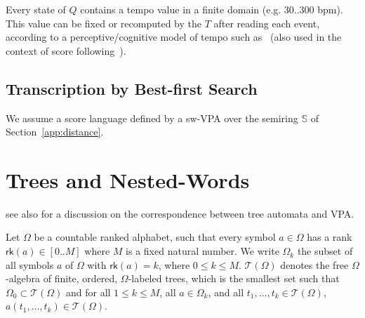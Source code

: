 \documentclass[runningheads]{llncs}
\newcommand{\T}{\mathcal{T}}
\newcommand{\Semiring}{\mathbb{S}}
\def\SWVPA{\textsf{sw-VPA}\xspace}
\def\Omegai{{\Omega_\mathsf{i}}}
\newcommand{\rank}{\mathsf{rk}}
\begin{document}
Every state of $Q$ contains a 
tempo value in a finite domain (e.g. 30..300 bpm).
This value can be fixed 
or recomputed by the $T$ %
after reading each event, 
according to a perceptive/cognitive model of tempo 
such as~\cite{LargeJones99tempo}
(also used in the context of score following~\cite{Cont10TPAMI}).


\subsection{Transcription by Best-first Search}
We assume a score language defined by a \SWVPA over the semiring 
$\Semiring$ of Section~\ref{app:distance}.






%
% 

%






\newpage
\appendix 


\section{Trees and Nested-Words}
see also \cite{Caralp12VPAmult} for a discussion on the correspondence 
between tree automata and VPA.

Let $\Omega$ be a countable ranked alphabet, such that 
every symbol $a \in \Omega$ has a rank 
$\rank(a) \in [0..M]$ where $M$ is a fixed natural number.
We write $\Omega_k$ the subset of all symbols $a$ of $\Omega$
with $\rank(a) = k$, where $0 \leq k \leq M$.
%
$\T(\Omega)$ denotes the free $\Omega$-algebra of finite, ordered, 
$\Omega$-labeled trees, 
which is the smallest set such that  $\Omega_0 \subset \T(\Omega)$
and for all $1 \leq k \leq M$, all $a \in \Omega_k$, 
and all $t_1, \ldots, t_k \in \T(\Omega)$, $a(t_1, \ldots, t_k) \in \T(\Omega)$.
%
\end{document}
